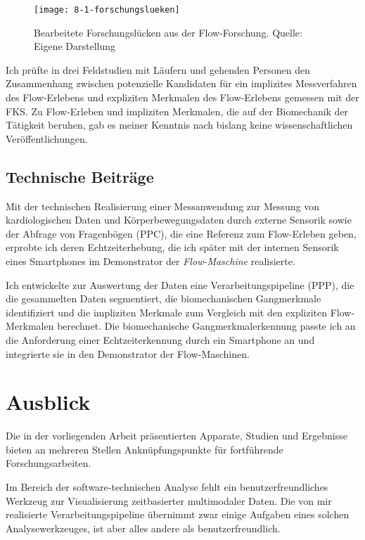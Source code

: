 \begin{figure}[ht]
	\centering
		\texttt{[image: 8-1-forschungslueken]}
	\caption[Bearbeitete Forschungslücken aus der Flow-Forschung]{Bearbeitete Forschungslücken aus der Flow-Forschung. Quelle: Eigene Darstellung}
	\label{fig:8_1_forschungslueken}
\end{figure}

Ich prüfte in drei Feldstudien mit Läufern und gehenden Personen den Zusammenhang zwischen potenzielle Kandidaten für ein implizites Messverfahren des Flow-Erlebens und expliziten Merkmalen des Flow-Erlebens gemessen mit der \ac{FKS}. Zu Flow-Erleben und impliziten Merkmalen, die auf der Biomechanik der Tätigkeit beruhen, gab es meiner Kenntnis nach bislang keine wissenschaftlichen Veröffentlichungen. 

\subsection{Technische Beiträge}
Mit der technischen Realisierung einer Messanwendung zur Messung von kardiologischen Daten und Körperbewegungsdaten durch externe Sensorik sowie der Abfrage von Fragenbögen (\ac{PPC}), die eine Referenz zum Flow-Erleben geben, erprobte ich deren Echtzeiterhebung, die ich später mit der internen Sensorik eines Smartphones im Demonstrator der \emph{Flow-Maschine} realisierte. 

Ich entwickelte zur Auswertung der Daten eine Verarbeitungspipeline (\ac{PPP}), die die gesammelten Daten segmentiert, die biomechanischen Gangmerkmale identifiziert und die impliziten Merkmale zum Vergleich mit den expliziten Flow-Merkmalen berechnet. Die biomechanische Gangmerkmalerkennung passte ich an die Anforderung einer Echtzeiterkennung durch ein Smartphone an und integrierte sie in den Demonstrator der Flow-Maschinen. 

\section{Ausblick} 
\label{sec:ausblick} 
Die in der vorliegenden Arbeit präsentierten Apparate, Studien und Ergebnisse bieten an mehreren Stellen Anknüpfungspunkte für fortführende Forschungsarbeiten.

Im Bereich der software-technischen Analyse fehlt ein benutzerfreundliches Werkzeug zur Visualisierung zeitbasierter multimodaler Daten. Die von mir realisierte Verarbeitungspipeline übernimmt zwar einige Aufgaben eines solchen Analysewerkzeuges, ist aber alles andere als benutzerfreundlich. 

